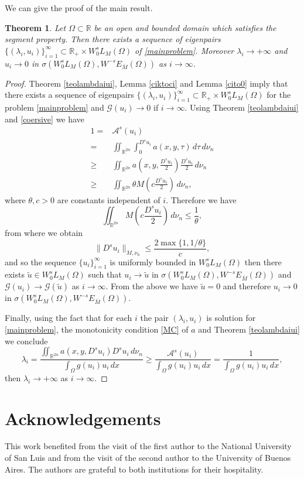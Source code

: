 \documentclass{amsart}
\newcommand{\R}{{\mathbb R}}
\newcommand{\EE}{{\mathcal A}^s}
\newcommand{\G}{{\mathcal G}}
\newtheorem{teo}{Theorem}[section]
\theoremstyle{remark}
\theoremstyle{definition}
\numberwithin{equation}{section}
\begin{document}
We can give the proof of the main result.
\begin{teo}\label{teo.main}
Let $\Omega\subset \R$ be an open and bounded domain which satisfies the segment property. Then there exists  a sequence of eigenpairs $\{(\lambda_i,u_i)\}_{i=1}^\infty\subset \R_+\times W_0^sL_M(\Omega)$  of \eqref{mainproblem}. Moreover $\lambda_i\to+\infty$ and $u_i\to 0$ in $\sigma(W_0^sL_M(\Omega), W^{-s}E_{\bar{M}}(\Omega))$ as $i\to \infty$. 	
\end{teo}
\begin{proof}
Theorem \ref{teolambdaiui}, Lemma \ref{ciktoci} and Lemma \ref{cito0} imply that there exists a sequence of eigenpairs $\{(\lambda_i,u_i)\}_{i=1}^\infty\subset \R_+\times W_0^sL_M(\Omega)$ for the problem \eqref{mainproblem} and $\G(u_i)\to 0$ if $i\to\infty$. Using Theorem \ref{teolambdaiui} and \eqref{coersive} we have
\begin{align*}
1=&\EE(u_i)
\\
=&\iint_{\R^{2n}}\int_0^{D^s u_i}a(x,y,\tau)\,d\tau\,d\nu_n
\\
\geq & \iint_{\R^{2n}}a \left (x,y,\frac{D^su_i}{2}\right)\frac{D^su_i}{2}\,d\nu_n	
\\
\geq & \iint_{\R^{2n}}\theta M\left (c \frac{D^s u_i}{2}\right )\,d\nu_n, 
\end{align*}
where $\theta,c>0$ are constants independent of $i$. Therefore we have
$$
\iint_{\R^{2n}} M\left (c \frac{D^s u_i}{2}\right )\,d\nu_n\leq \frac{1}{\theta},
$$
from where we obtain
$$
\|D^su_i\|_{M,\nu_n}\leq \frac{2 \max\{1, 1/\theta\}}{c},
$$
and so the sequence $\{u_i\}_{i=1}^\infty$ is uniformly bounded in $W_0^s L_M(\Omega)$ then there exists $\tilde{u}\in W_0^sL_M(\Omega)$ such that $u_i\to \tilde{u}$ in $\sigma(W_0^sL_M(\Omega), W^{-s}E_{\bar{M}}(\Omega))$ and $\G(u_i)\to \G(\tilde{u})$ as $i\to\infty$. From the above we have $\tilde{u}=0$ and therefore $u_i\to 0$ in $\sigma(W_0^sL_M(\Omega), W^{-s}E_{\bar{M}}(\Omega))$. 	

Finally, using the fact that for each $i$ the pair $(\lambda_i,u_i)$ is solution for \eqref{mainproblem}, the monotonicity condition \eqref{MC} of $a$ and Theorem \ref{teolambdaiui} we conclude
$$
\lambda_i=\frac{\iint_{\R^{2n}}a(x,y,D^su_i)D^su_i\,d\nu_n}{\int_\Omega g(u_i)u_i\,dx}\geq \frac{\EE (u_i)}{\int_\Omega g(u_i)u_i\,dx}= \frac{1}{\int_\Omega g(u_i)u_i\,dx},
$$
then $\lambda_i\to+\infty$ as $i\to\infty$.
\end{proof}

\section*{Acknowledgements}
This work benefited from the visit of the first author to the National University of San Luis and from the visit of the second author to the University of Buenos Aires. The authors are grateful to both institutions for their hospitality.
\end{document}
